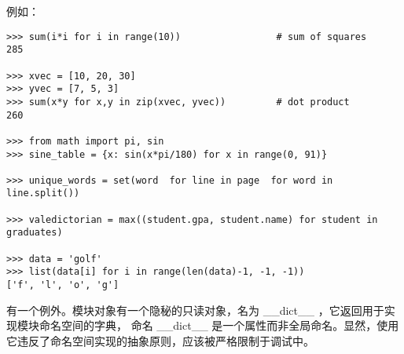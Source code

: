 \documentclass[UTF8]{ctexart}
\begin{document}
例如：
\begin{verbatim}
>>> sum(i*i for i in range(10))                 # sum of squares
285

>>> xvec = [10, 20, 30]
>>> yvec = [7, 5, 3]
>>> sum(x*y for x,y in zip(xvec, yvec))         # dot product
260

>>> from math import pi, sin
>>> sine_table = {x: sin(x*pi/180) for x in range(0, 91)}

>>> unique_words = set(word  for line in page  for word in line.split())

>>> valedictorian = max((student.gpa, student.name) for student in graduates)

>>> data = 'golf'
>>> list(data[i] for i in range(len(data)-1, -1, -1))
['f', 'l', 'o', 'g']
\end{verbatim}

有一个例外。模块对象有一个隐秘的只读对象，名为 \_\_dict\_\_ ，它返回用于实现模块命名空间的字典，
命名 \_\_dict\_\_ 是一个属性而非全局命名。显然，使用它违反了命名空间实现的抽象原则，应该被严格限制于调试中。
\end{document}

